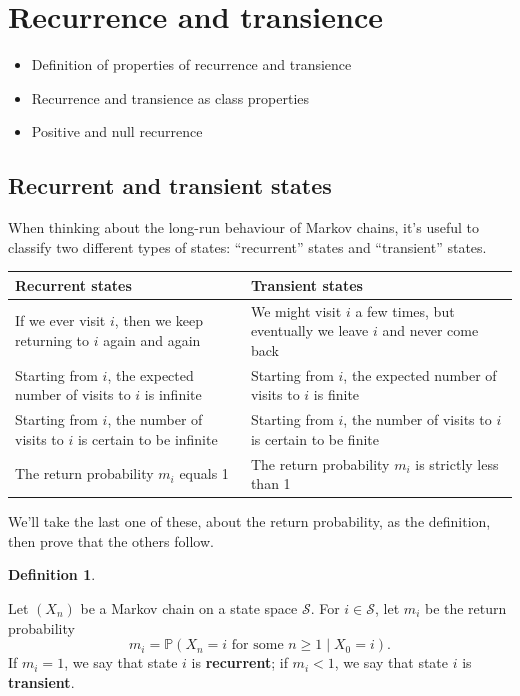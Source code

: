 \documentclass[
  a4paper,
]{article}
\providecommand{\tightlist}{%
  \setlength{\itemsep}{0pt}\setlength{\parskip}{0pt}}
\theoremstyle{definition}
\newtheorem{definition}{Definition}[section]
\theoremstyle{definition}
\theoremstyle{definition}
\theoremstyle{remark}
\begin{document}
\hypertarget{S09-recurrence-transience}{%
\section{Recurrence and transience}\label{S09-recurrence-transience}}

\begin{itemize}
\tightlist
\item
  Definition of properties of recurrence and transience
\item
  Recurrence and transience as class properties
\item
  Positive and null recurrence
\end{itemize}

\hypertarget{rec-trans-def}{%
\subsection{Recurrent and transient states}\label{rec-trans-def}}

When thinking about the long-run behaviour of Markov chains, it's useful to classify two different types of states: ``recurrent'' states and ``transient'' states.

\begin{longtable}[]{@{}
  >{\raggedright\arraybackslash}p{}
  >{\raggedright\arraybackslash}p{}@{}}
\toprule
Recurrent states & Transient states \\
\midrule
\endhead
If we ever visit \(i\), then we keep returning to \(i\) again and again & We might visit \(i\) a few times, but eventually we leave \(i\) and never come back \\
Starting from \(i\), the expected number of visits to \(i\) is infinite & Starting from \(i\), the expected number of visits to \(i\) is finite \\
Starting from \(i\), the number of visits to \(i\) is certain to be infinite & Starting from \(i\), the number of visits to \(i\) is certain to be finite \\
The return probability \(m_i\) equals 1 & The return probability \(m_i\) is strictly less than 1 \\
\bottomrule
\end{longtable}

We'll take the last one of these, about the return probability, as the definition, then prove that the others follow.

\begin{definition}
\protect\hypertarget{def:unlabeled-div-3}{}\label{def:unlabeled-div-3}

Let \((X_n)\) be a Markov chain on a state space \(\mathcal S\). For \(i \in \mathcal S\), let \(m_i\) be the return probability
\[ m_i = \mathbb P(X_n = i \text{ for some $n \geq 1$} \mid X_0 = i) . \]
If \(m_i = 1\), we say that state \(i\) is \textbf{recurrent}; if \(m_i < 1\), we say that state \(i\) is \textbf{transient}.

\end{definition}
\end{document}
